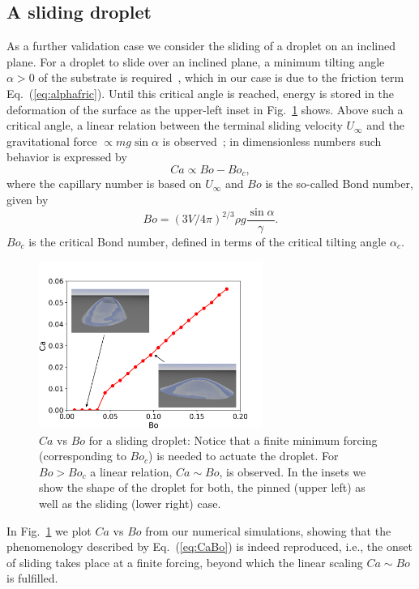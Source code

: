 \subsection{A sliding droplet}
As a further validation case we consider the sliding of a droplet on an inclined plane.
For a droplet to slide over an inclined plane, a minimum tilting angle $\alpha >0$ of the substrate is required~\cite{furmidgeStudiesPhaseInterfaces1962}, which in our case is due to the friction term Eq.~(\ref{eq:alphafric}). 
Until this critical angle is reached, energy is stored in the deformation of the surface as the upper-left inset in Fig.~\ref{fig:CaBo} shows. 
Above such a critical angle, a linear relation between the terminal sliding velocity $U_{\infty}$ and the gravitational force $\propto m g \sin \alpha$ is observed~\cite{podgorskiCornersCuspsPearls2001,kimSlidingLiquidDrops2002,sbragagliaSlidingDropsAlternating2014}; in dimensionless numbers such behavior is expressed by 
\begin{equation}\label{eq:CaBo}
  Ca \propto Bo - Bo_c,
\end{equation}
where the capillary number is based on $U_{\infty}$ and $Bo$ is the so-called Bond number, given by
\begin{equation}
  Bo = (3V/4\pi)^{2/3}\rho g \frac{\sin\alpha}{\gamma}.
\end{equation}
$Bo_c$ is the critical Bond number, defined in terms of the critical tilting angle $\alpha_c$.
  \begin{figure}
    \centering
    \includegraphics[width=0.65\textwidth]{graphics/Fig_7_Ca_Bo_true_with_pic.png}
    \caption{$Ca$ vs $Bo$ for a sliding droplet: Notice that a finite minimum forcing (corresponding to $Bo_c$) is needed to actuate the droplet. 
    For $Bo > Bo_c$ a linear relation, $Ca \sim Bo$, is observed. 
    In the insets we show the shape of the droplet for both, the pinned (upper left) as well as the sliding (lower right) case.
    }
    \label{fig:CaBo}
\end{figure}
In Fig.~\ref{fig:CaBo} we plot $Ca$ vs $Bo$ from our numerical simulations, showing that the phenomenology described by Eq.~(\ref{eq:CaBo}) is indeed reproduced, i.e., the onset of sliding takes place at a finite forcing, beyond which the linear scaling $Ca \sim Bo$ is fulfilled. 

